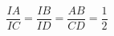 \documentclass[preview]{standalone}
\begin{document}
\begin{center}
$$\frac{IA}{IC}=\frac{IB}{ID}=\frac{AB}{CD}=\frac{1}{2}$$
\end{center}
\end{document}

